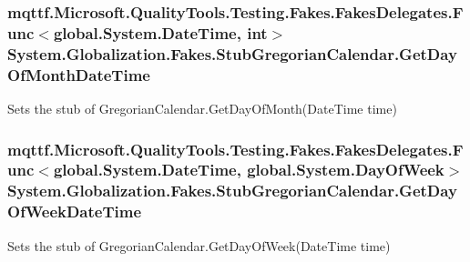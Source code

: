 \hypertarget{class_system_1_1_globalization_1_1_fakes_1_1_stub_gregorian_calendar_a398b5c26aa3aefc2a3e85b232ffa4485}{
\subsubsection[{Get\-Day\-Of\-Month\-Date\-Time}]{\setlength{\rightskip}{0pt plus 5cm}mqttf.\-Microsoft.\-Quality\-Tools.\-Testing.\-Fakes.\-Fakes\-Delegates.\-Func$<$global.\-System.\-Date\-Time, int$>$ System.\-Globalization.\-Fakes.\-Stub\-Gregorian\-Calendar.\-Get\-Day\-Of\-Month\-Date\-Time}}\label{class_system_1_1_globalization_1_1_fakes_1_1_stub_gregorian_calendar_a398b5c26aa3aefc2a3e85b232ffa4485}


Sets the stub of Gregorian\-Calendar.\-Get\-Day\-Of\-Month(\-Date\-Time time)

\hypertarget{class_system_1_1_globalization_1_1_fakes_1_1_stub_gregorian_calendar_ab9f50745563340fda4199f2393fb62ea}{
\subsubsection[{Get\-Day\-Of\-Week\-Date\-Time}]{\setlength{\rightskip}{0pt plus 5cm}mqttf.\-Microsoft.\-Quality\-Tools.\-Testing.\-Fakes.\-Fakes\-Delegates.\-Func$<$global.\-System.\-Date\-Time, global.\-System.\-Day\-Of\-Week$>$ System.\-Globalization.\-Fakes.\-Stub\-Gregorian\-Calendar.\-Get\-Day\-Of\-Week\-Date\-Time}}\label{class_system_1_1_globalization_1_1_fakes_1_1_stub_gregorian_calendar_ab9f50745563340fda4199f2393fb62ea}


Sets the stub of Gregorian\-Calendar.\-Get\-Day\-Of\-Week(\-Date\-Time time)

